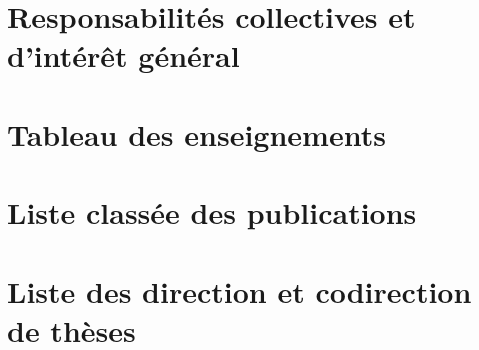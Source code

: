 \documentclass[12pt, a4paper, french]{article}
\begin{document}
\section{Responsabilités collectives et d’intérêt général  \label{sec:col}} 


% 

\appendix \newpage

\section{Tableau des enseignements \label{app:ens}}


\section{Liste classée des publications \label{app:pub}}


\section{Liste des direction et codirection de thèses  \label{app:phd}}


% 
% 

\end{document}
